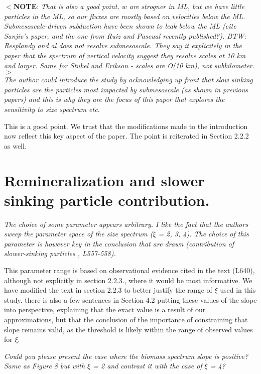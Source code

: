\documentclass[12pt,letter]{article}
\newcommand{\note}[1]{\color{red}$<$\textbf{NOTE}: \textit{#1}$>$\color{black}}
\begin{document}
\note{That is also a good point. $w$ are strogner in ML, but we have little particles in the ML, so our fluxes are mostly based on velocities below the ML. Submesoscale-driven subduction have been shown to leak below the ML (cite Sanjiv's paper, and the one from Ruiz and Pascual recently published?). BTW: Resplandy and al does not resolve submesoscale. They say it explicitely in the paper that the spectrum of vertical velocity suggest they resolve scales at 10 km and larger. Same for Stukel and Erikson - scales are O(10 km), not subkilometer.}\\

\textit{The author could introduce the study by acknowledging up front that slow sinking particles are the particles most impacted by submesoscale (as shown in previous papers) and this is why they are the focus of this paper that explores the sensitivity to size spectrum etc.}

{\color{blue}
	This is a good point. We trust that the modifications made to the introduction now reflect this key aspect of the paper. The point is reiterated in Section 2.2.2 as well.}


\section*{Remineralization and slower sinking particle contribution.}
\textit{The choice of some parameter appears arbitrary. I like the fact that the authors sweep the parameter space of the size spectrum ($\xi$ = 2, 3, 4). The choice of this parameter is however key in the conclusion that are drawn (contribution of slower-sinking particles , L557-558).}

{\color{blue}
	This parameter range is based on observational evidence cited in the text (L640), although not explicitly in section 2.2.3., where it would be most informative. We have modified the text in section 2.2.3 to better justify the range of $\xi$ used in this study. there is also a few sentences in Section 4.2 putting these values of the slope into perspective, explaining that the exact value is a result of our approximations, but that the conclusion of the importance of constraining that slope remains valid, as the threshold is likely within the range of observed values for $\xi$.\\}

\textit{Could you please present the case where the biomass spectrum slope is positive? Same as Figure 8 but with $\xi$ = 2 and contrast it with the case of $\xi$ = 4?\\}
\end{document}
